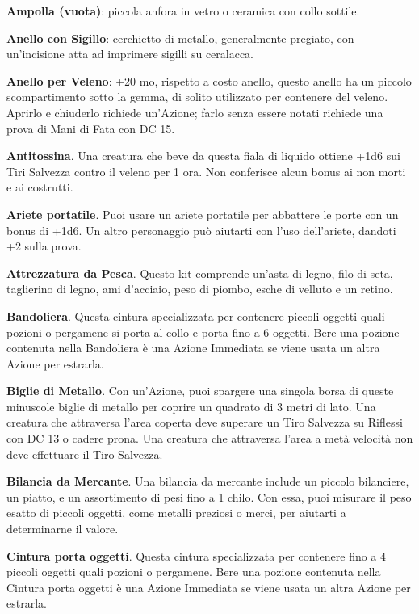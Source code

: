 \begin{multicols}{2}
\textbf{Ampolla (vuota)}: piccola anfora in vetro o ceramica con collo sottile.

\textbf{Anello con Sigillo}: cerchietto di metallo, generalmente pregiato, con un'incisione atta ad imprimere sigilli su ceralacca.

\textbf{Anello per Veleno}\label{Anello per veleno}\hypertarget{Anello per veleno}{}: +20 mo, rispetto a costo anello, questo anello ha un piccolo scompartimento sotto la gemma, di solito utilizzato per contenere del veleno. Aprirlo e chiuderlo richiede un'Azione; farlo senza essere notati richiede una prova di Mani di Fata con DC 15.

\textbf{Antitossina}\label{Antitossina}\hypertarget{Antitossina}{}. Una creatura che beve da questa fiala di liquido ottiene +1d6 sui Tiri Salvezza contro il veleno per 1 ora. Non conferisce alcun bonus ai non morti e ai costrutti.

\textbf{Ariete portatile}\label{Ariete portatile}\hypertarget{Ariete portatile}{}. Puoi usare un ariete portatile per abbattere le porte con un bonus di +1d6. Un altro personaggio può aiutarti con l'uso dell'ariete, dandoti +2 sulla prova.

\textbf{Attrezzatura da Pesca}. Questo kit comprende un'asta di legno, filo di seta, taglierino di legno, ami d'acciaio, peso di piombo, esche di velluto e un retino.

\textbf{Bandoliera}\label{Bandoliera}\hypertarget{Bandoliera}{}. Questa cintura specializzata per contenere piccoli oggetti quali pozioni o pergamene si porta al collo e porta fino a 6 oggetti. Bere una pozione contenuta nella Bandoliera è una Azione Immediata se viene usata un altra Azione per estrarla.

\textbf{Biglie di Metallo}. Con un'Azione, puoi spargere una singola borsa di queste minuscole biglie di metallo per coprire un quadrato di 3 metri di lato. Una creatura che attraversa l'area coperta deve superare un Tiro Salvezza su Riflessi con DC 13 o cadere prona. Una creatura che attraversa l'area a metà velocità non deve effettuare il Tiro Salvezza.

\textbf{Bilancia da Mercante}. Una bilancia da mercante include un piccolo bilanciere, un piatto, e un assortimento di pesi fino a 1 chilo. Con essa, puoi misurare il peso esatto di piccoli oggetti, come metalli preziosi o merci, per aiutarti a determinarne il valore.

\textbf{Cintura porta oggetti}. Questa cintura specializzata per contenere fino a 4 piccoli oggetti quali pozioni o pergamene. Bere una pozione contenuta nella Cintura porta oggetti è una Azione Immediata se viene usata un altra Azione per estrarla.\label{Cintura porta oggetti}\hypertarget{Cintura porta oggetti}{}


\end{multicols}

